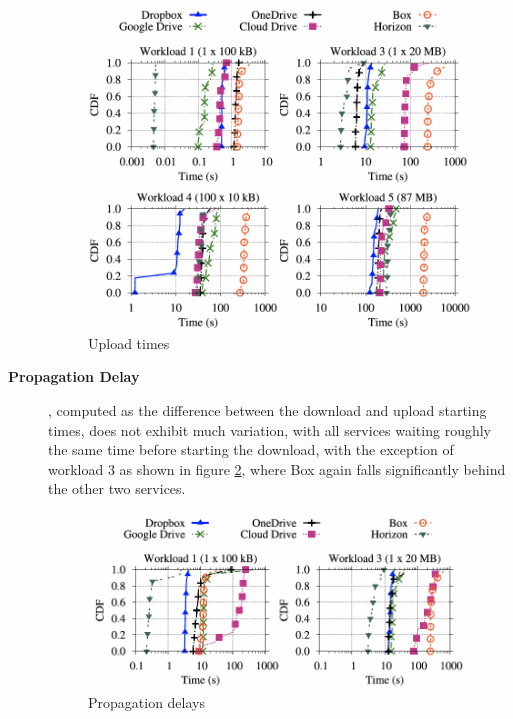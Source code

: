 \begin{description}
	\begin{figure} [h]
		\centering
		\includegraphics[scale=0.7]{images/upload_times}
		\caption{\label{fig:upload}Upload times}
	\end{figure}
	
	\item[\textbf{Propagation Delay}], computed as the difference between the download and upload starting times,  does not exhibit much variation, with all services waiting roughly the same time before starting the download, with the exception of workload 3 as shown in figure \ref{fig:propagation delay}, where Box again falls significantly behind the other two services. 
	
	\begin{figure} [h]
		\centering
		\includegraphics[scale=0.7]{images/propagation_delay}
		\caption{\label{fig:propagation delay}Propagation delays}
	\end{figure}
	

\end{description}

